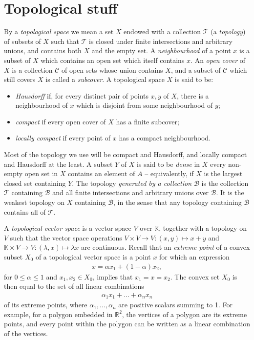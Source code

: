 \documentclass[12pt,a4paper]{report}
\theoremstyle{plain}
\theoremstyle{definition}
\newcommand{\1}{\mathbbm{1}}
\newcommand{\R}{\mathbb{R}}
\newcommand{\B}{\mathcal{B}}
\newcommand{\T}{\mathcal{T}}
\newcommand{\cover}{\mathcal{C}}
\begin{document}
\section{Topological stuff}
By a \emph{topological space} we mean a set $X$ endowed with a collection $\T$ (a \emph{topology}) of 
subsets of $X$ such that $\T$ is closed under finite intersections and arbitrary unions, and contains 
both $X$ and the empty set. A \emph{neighbourhood} of a point $x$ is a subset of $X$ which contains an 
open set which itself contains $x$. An \emph{open cover} of $X$ is a collection $\cover$ of open sets 
whose union contains $X$, and a subset of $\cover$ which still covers $X$ is called a \emph{subcover}. 
A topological space $X$ is said to be:
\begin{itemize}
	\item \emph{Hausdorff} if, for every distinct pair of points $x,y$ of $X$, there is a neighbourhood 
	of $x$ which is disjoint from some neighbourhood of $y$;
	\item \emph{compact} if every open cover of $X$ has a finite subcover;
	\item \emph{locally compact} if every point of $x$ has a compact neighbourhood.
\end{itemize}
Most of the topology we use will be compact and Hausdorff, and locally compact and Hausdorff at the 
least.
A subset $Y$ of $X$ is said to be \emph{dense} in $X$ every non-empty open set in $X$ contains an 
element of $A$ -- equivalently, if $X$ is the largest closed set containing $Y$.
The topology \emph{generated by a collection $\B$} is the collection $\T$ containing $\B$ and all finite 
intersections and arbitrary unions over $\B$. It is the weakest topology on $X$ containing $\B$, in the 
sense that any topology containing $\B$ contains all of $\T$.

A \emph{topological vector space} is a vector space $V$ over $\mathbb K$, together with a topology on 
$V$ such that the vector space operations $V\times V\to V:(x,y)\mapsto x+y$ and $\mathbb{K}\times V\to 
V:(\lambda,x)\mapsto \lambda x$ are continuous. 
Recall that an \emph{extreme point} of a convex subset $X_0$ of a topological vector space is a point 
$x$ for which an expression
\begin{align*}
	x = \alpha x_1 +(1-\alpha)x_2,
\end{align*}
for $0\leq\alpha\leq1$ and $x_1,x_2\in X_0$, implies that $x_1=x=x_2$. 
The convex set $X_0$ is then equal to the set of all linear combinations
\begin{align*}
	\alpha_1 x_1+\dots +\alpha_n x_n
\end{align*}
of its extreme points, where $\alpha_1,\dots,\alpha_n$ are positive scalars summing to 1.
For example, for a polygon embedded in $\R^2$, the vertices of a polygon are its extreme points, and
every point within the polygon can be written as a linear combination of the vertices.
\end{document}
